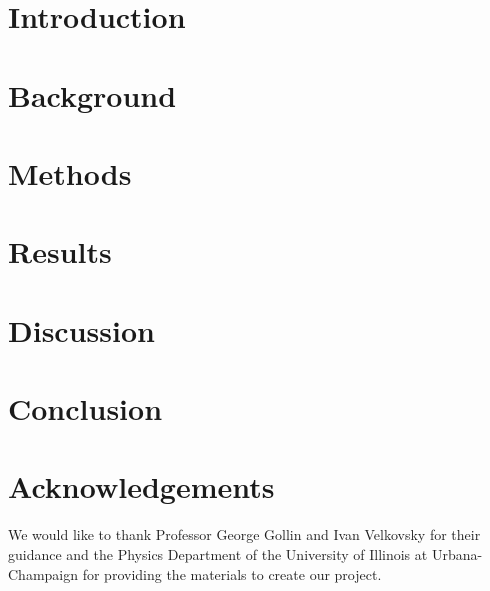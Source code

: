 \documentclass[11pt, letterpaper]{report}
\begin{document}



\doublespacing




 \tableofcontents

 \chapter{Introduction}
 

 \chapter{Background}
 

 \chapter{Methods}
 

 \chapter{Results}
 

 \chapter{Discussion}
 

 \chapter{Conclusion}
 

 \clearpage

\chapter*{Acknowledgements}
\noindent
 We would like to thank Professor George Gollin and Ivan Velkovsky for their guidance and the Physics Department of the University of Illinois at Urbana-Champaign for providing the materials to create our project.

 \clearpage

 \listoffigures

 \clearpage

 \printbibliography[title={References}]
\end{document}
